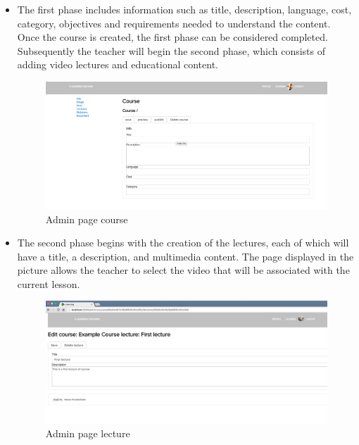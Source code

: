 \begin{itemize}
\item The first phase includes information such as title, description, language, cost, category, objectives and requirements needed to understand the content. Once the course is created, the first phase can be considered completed.
Subsequently the teacher will begin the second phase, which consists of adding video lectures and educational content.

\begin{figure}[htb]
 \centering
 \includegraphics[width=1.0\linewidth]{images/chapter5/insert_course_page.png}\hfill
 \caption[Admin page course]{Admin page course}
 \label{fig:fourV}
\end{figure}

\item The second phase begins with the creation of the lectures, each of which will have a title, a description, and multimedia content.
The page displayed in the picture allows the teacher to select the video that will be associated with the current lesson.

\begin{figure}[htb]
 \centering
 \includegraphics[width=1.0\linewidth]{images/chapter5/insert_lecture.png}\hfill
 \caption[Admin page lecture]{Admin page lecture}
 \label{fig:fourV}
\end{figure}

\end{itemize}

